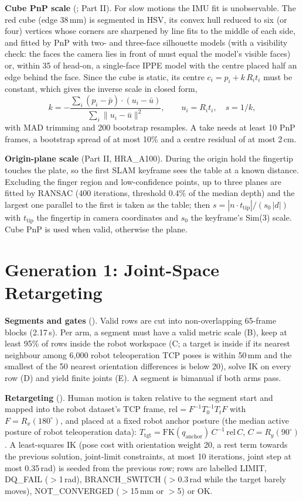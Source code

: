 \documentclass[conference,10pt]{IEEEtran}
\newcommand{\mm}{\,mm\xspace}
\begin{document}
\textbf{Cube PnP scale} (; Part II). For slow motions the IMU fit is unobservable. The red
cube (edge 38\mm) is segmented in HSV, its convex hull reduced to six (or four) vertices whose corners are sharpened by line fits
to the middle of each side, and fitted by PnP with two- and three-face silhouette models (with a visibility check: the faces the
camera lies in front of must equal the model's visible faces) or, within 35\textdegree{} of head-on, a single-face IPPE model with
the centre placed half an edge behind the face. Since the cube is static, its centre $c_i=p_i + k\,R_i t_i$ must be constant, which
gives the inverse scale in closed form,
\begin{equation}
k = -\frac{\sum_i (p_i-\bar p)\cdot(u_i-\bar u)}{\sum_i\lVert u_i-\bar u\rVert^2},\qquad u_i=R_i t_i,\quad s=1/k,
\end{equation}
with MAD trimming and 200 bootstrap resamples. A take needs at least 10 PnP frames, a bootstrap spread of at most 10\% and a
centre residual of at most 2\,cm.

\textbf{Origin-plane scale} (Part II, HRA\_A100). During the origin hold the fingertip touches the plate, so the first SLAM keyframe
sees the table at a known distance. Excluding the finger region and low-confidence points, up to three planes are fitted by RANSAC
(400 iterations, threshold 0.4\% of the median depth) and the largest one parallel to the first is taken as the table; then
$s=|n\cdot t_\text{tip}|/(s_0\,|d|)$ with $t_\text{tip}$ the fingertip in camera coordinates and $s_0$ the keyframe's Sim(3) scale.
Cube PnP is used when valid, otherwise the plane.

\section{Generation 1: Joint-Space Retargeting}\label{sec:gen1}
\textbf{Segments and gates} (). Valid rows are cut into non-overlapping 65-frame blocks (2.17\,s). Per arm, a
segment must have a valid metric scale (B), keep at least 95\% of rows inside the robot workspace (C; a target is inside if its
nearest neighbour among 6{,}000 robot teleoperation TCP poses is within 50\mm{} and the smallest of the 50 nearest orientation
differences is below 20\textdegree), solve IK on every row (D) and yield finite joints (E). A segment is bimanual if both arms
pass.

\textbf{Retargeting} (). Human motion is taken relative to the segment start
and mapped into the robot dataset's TCP frame, $\text{rel}=F^{-1}T_{0}^{-1}T_{t}F$ with $F=R_x(180^\circ)$, and placed at a fixed
robot anchor posture (the median active posture of robot teleoperation data): $T_\text{tgt}=\mathrm{FK}(q_\text{anchor})\,C^{-1}\,
\text{rel}\,C$, $C=R_y(90^\circ)$. A least-squares IK (pose cost with orientation weight 20, a rest term towards the previous
solution, joint-limit constraints, at most 10 iterations, joint step at most 0.35\,rad) is seeded from the previous row; rows are
labelled LIMIT, DQ\_FAIL ($>$1\,rad), BRANCH\_SWITCH ($>$0.3\,rad while the target barely moves), NOT\_CONVERGED ($>$15\mm{} or
$>$5\textdegree) or OK.
\end{document}
